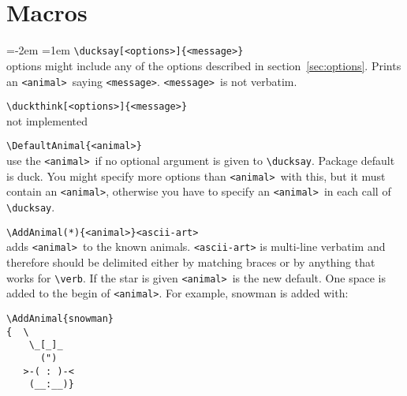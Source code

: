 \documentclass[]{article}
\newcommand*{\anml}{\texttt{<animal>}}
\newcommand*{\msg}{\texttt{<message>}}
\begin{document}
\begin{titlepage}%
  \makeatletter
  \centering
  \Large
    \\
  \vfill
  \normalsize
  \hspace*{-2cm}
    \ducksay[cow,bubble=\large]{\ducksay@version}\\
  \small
  \vspace*{-5cm}\hspace*{5cm}
  \mbox{}\hfil
  \vspace{2cm}
  \vfill
  \vfill
  \hspace*{-0cm}
  \large
  \small
  \makeatother
\end{titlepage}%
\section{Macros}
\bgroup
\parindent=-2em
\parskip=1em
\hspace*{-2em}%
\verb|\ducksay[<options>]{<message>}|\\
  options might include any of the options described in
  section~\ref{sec:options}. Prints an \anml\ saying \msg. \msg\ is not
  verbatim.

\verb|\duckthink[<options>]{<message>}|\\
  not implemented

\verb|\DefaultAnimal{<animal>}|\\
  use the \anml\ if no optional argument is given to \verb|\ducksay|. Package
  default is duck. You might specify more options than \anml\ with this, but it
  must contain an \anml, otherwise you have to specify an \anml\ in each call of
  \verb|\ducksay|.

\verb|\AddAnimal(*){<animal>}<ascii-art>|\\
  adds \anml\ to the known animals. \texttt{<ascii-art>} is multi-line verbatim
  and therefore should be delimited either by matching braces or by anything
  that works for \verb|\verb|. If the star is given \anml\ is the new default.
  One space is added to the begin of \anml. For example, snowman is added with:
\begin{verbatim}
\AddAnimal{snowman}
{  \
    \_[_]_
      (")
   >-( : )-<
    (__:__)}
\end{verbatim}
\egroup
\end{document}
